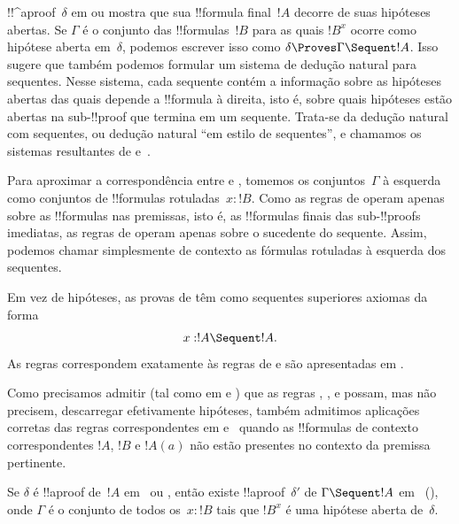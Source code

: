 \documentclass[../../../include/open-logic-section]{subfiles}
\begin{document}


!!^a{proof}~$\delta$ em  ou  mostra que sua
!!{formula} final~$!A$ decorre de suas hipóteses abertas. Se $\Gamma$ é
o conjunto das !!{formula}s~$!B$ para as quais $!B^x$ ocorre como
hipótese aberta em~$\delta$, podemos escrever isso como $\delta \Proves
\Gamma \Sequent !A$. Isso sugere que também podemos formular um sistema
de dedução natural para sequentes. Nesse sistema, cada sequente contém a
informação sobre as hipóteses abertas das quais depende a !!{formula} à
direita, isto é, sobre quais hipóteses estão abertas na sub-!!{proof} que
termina em um sequente. Trata-se da dedução natural com sequentes, ou
dedução natural ``em estilo de sequentes'', e chamamos os sistemas
resultantes de  e~.

Para aproximar a correspondência entre  e , tomemos os
conjuntos~$\Gamma$ à esquerda como conjuntos de !!{formula}s
rotuladas~$x:!B$. Como as regras de  operam apenas sobre as
!!{formula}s nas premissas, isto é, as !!{formula}s finais das
sub-!!{proof}s imediatas, as regras de  operam apenas sobre o
sucedente do sequente. Assim, podemos chamar simplesmente de
contexto as fórmulas rotuladas à esquerda dos sequentes.

Em vez de hipóteses, as provas de  têm como sequentes superiores
axiomas da forma
\[x:!A \Sequent !A.\]
As regras correspondem exatamente às regras de  e são
apresentadas em .



Como precisamos admitir (tal como em  e ) que as
regras \Intro{\lif}, \Intro{\lnot}, \Elim{\lor} e \Elim{\lexists}
possam, mas não precisem, descarregar efetivamente hipóteses, também
admitimos aplicações corretas das regras correspondentes em 
e~ quando as !!{formula}s de contexto correspondentes $!A$,
$!B$ e $!A(a)$ não estão presentes no contexto da premissa pertinente.

\begin{prop}
Se $\delta$ é !!a{proof} de~$!A$ em~ ou , então
existe !!a{proof}~$\delta'$ de $\Gamma \Sequent !A$ em~
(), onde $\Gamma$ é o conjunto de todos os~$x:!B$ tais que
$!B^x$ é uma hipótese aberta de~$\delta$.
\end{prop}
\end{document}
